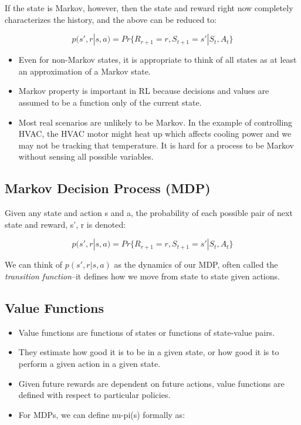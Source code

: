 If the state is Markov, however, then the state and reward right now completely characterizes the history, and the above can be reduced to:

\begin{equation}
p(s', r | s, a) = Pr \{R_{r+1} = r, S_{t+1} = s' | S_t, A_t\}
\end{equation}

\begin{itemize}
\item Even for non-Markov states, it is appropriate to think of all states as at least an approximation of a Markov state.
\item Markov property is important in RL because decisions and values are assumed to be a function only of the current state.
\item Most real scenarios are unlikely to be Markov. In the example of controlling HVAC, the HVAC motor might heat up which affects cooling power and we may not be tracking that temperature. It is hard for a process to be Markov without sensing all possible variables.
\end{itemize}

\subsection{Markov Decision Process (MDP)}
Given any state and action s and a, the probability of each possible pair of next state and reward, s', r is denoted:

\begin{equation}
p(s', r | s, a) = Pr \{R_{r+1} = r, S_{t+1} = s' | S_t, A_t\}
\end{equation}

We can think of \(p(s', r | s, a)\) as the dynamics of our MDP, often called the \textit{transition function}–it defines how we move from state to state given actions. 

\subsection{Value Functions}
\begin{itemize}
\item Value functions are functions of states or functions of state-value pairs.
\item They estimate how good it is to be in a given state, or how good it is to perform a given action in a given state.
\item Given future rewards are dependent on future actions, value functions are defined with respect to particular policies.
\item For MDPs, we can define nu-pi(s) formally as:
\end{itemize}

